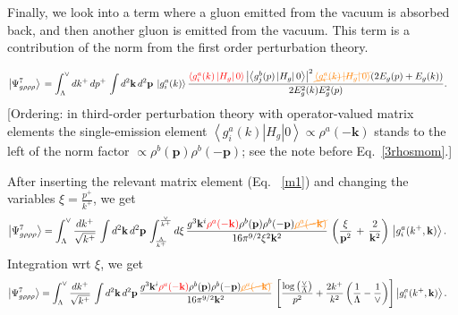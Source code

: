 \documentclass[aps,prd,amsmath,amssymb,nofootinbib]{revtex4-2}
\numberwithin{equation}{section}
\begin{document}
Finally, we look into a term where a gluon emitted from the vacuum is absorbed back, and then another gluon is emitted from the vacuum. This term is a contribution of the norm from the first order perturbation theory.
\begin{figure}[h]
    \label{fig:3}
\end{figure}
\begin{align}\label{degen}
\left|\Psi_{g\rho\rho\rho}^{7}\right\rangle \, & = \int_{\Lambda}^{\vee}dk^{+}\, dp^{+}\,\int d^{2}\mathbf{k}\, d^{2}\mathbf{p}\:\left|g_{i}^{a}(k)\right\rangle \frac{{\color{red}\left\langle g_{i}^{a}(k)\left|H_{g}\right|0\right\rangle}\left|\left\langle g_{j}^{b}(p)\left|H_{g}\right|0\right\rangle \right|^{2}{\color{orange}\cancel{\left\langle g_{i}^{a}(k)\left|H_{g}\right|0\right\rangle}} (2E_{g}(p)+E_{g}(k))}{2E_{g}^{2}(k)E_{g}^{2}(p)}.
\end{align} {\color{red}[Ordering: in third-order perturbation theory with operator-valued matrix elements the single-emission element $\left\langle g_{i}^{a}(k)\left|H_{g}\right|0\right\rangle\propto\rho^a(-\mathbf{k})$ stands to the left of the norm factor $\propto\rho^b(\mathbf{p})\rho^b(-\mathbf{p})$; see the note before Eq.~\eqref{3rhosmom}.]}\par\noindent
After inserting the relevant matrix element (Eq.~ \eqref{m1}) and changing the variables $\xi = \frac{p^{+}}{k^{+}}$, we get
\begin{align} \label{virtual}
  \left|\Psi_{g\rho\rho\rho}^{7}\right\rangle & =\int_{\Lambda}^{\vee}\frac{dk^{+}}{\sqrt{k^{+}}}\,\int d^{2}\mathbf{k}\, d^{2}\mathbf{p}\,\int_{\frac{\Lambda}{k^{+}}}^{\frac{\vee}{k^{+}}}d\xi\,\frac{g^{3}\mathbf{k}^{i}{\color{red}\rho^{a}(-\mathbf{k})}\rho^{b}(\mathbf{p})\rho^{b}(-\mathbf{p}){\color{orange}\cancel{\rho^{a}(-\mathbf{k})}}}{16\pi^{9/2}\xi^{2}\mathbf{k}^{2}}\,\left(\frac{\xi}{\mathbf{p}^{2}}\,+\,\frac{2}{\mathbf{k}^{2}}\right)\,\left|g_{i}^{a}(k^{+},\mathbf{k})\right\rangle.
\end{align}
Integration wrt $\xi$, we get
\begin{align} \label{zetainteg}
  \left|\Psi_{g\rho\rho\rho}^{7}\right\rangle & =\int_{\Lambda}^{\vee}\frac{dk^{+}}{\sqrt{k^{+}}}\,\int d^{2}\mathbf{k}\, d^{2}\mathbf{p}\,\frac{g^{3}\mathbf{k}^{i}{\color{red}\rho^{a}(-\mathbf{k})}\rho^{b}(\mathbf{p})\rho^{b}(-\mathbf{p}){\color{orange}\cancel{\rho^{a}(-\mathbf{k})}}}{16\pi^{9/2}\mathbf{k}^{2}}\,\left[\frac{\log{\left(\frac{\vee}{\Lambda}\right)}}{p^{2}}+\frac{2k^{+}}{k^{2}}\left(\frac{1}{\Lambda} - \frac{1}{\vee}\right)\right]\left|g_{i}^{a}(k^{+},\mathbf{k})\right\rangle. 
\end{align}
\end{document}
